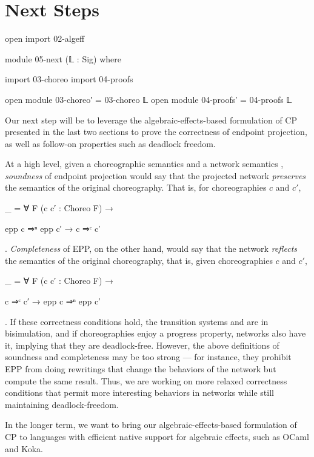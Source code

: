 \section{Next Steps}
\label{sec:next}

\begin{code}[hide]
open import 02-algeff

module 05-next (𝕃 : Sig) where

import 03-choreo
import 04-proofs

open module 03-choreo′ = 03-choreo 𝕃
open module 04-proofs′ = 04-proofs 𝕃

\end{code}

Our next step will be to leverage the algebraic-effects-based formulation of CP presented in the last two sections to prove the correctness of endpoint projection, as well as follow-on properties such as deadlock freedom.

At a high level, given a choreographic semantics  and a network semantics , \emph{soundness} of endpoint projection would say that the projected network \emph{preserves} the semantics of the original choreography.
%
That is, for choreographies $c$ and $c'$,
%
\begin{code}[hide]
_ = ∀ {F} (c c′ : Choreo F) →
\end{code}
%
\begin{code}[inline]
  epp c ⇒ⁿ epp c′ → c ⇒ᶜ c′
\end{code}.
%
\emph{Completeness} of EPP, on the other hand, would say that the network \emph{reflects} the semantics of the original choreography, that is, given choreographies $c$ and $c'$,
%
\begin{code}[hide]
_ = ∀ {F} (c c′ : Choreo F) →
\end{code}
%
\begin{code}[inline]
  c ⇒ᶜ c′ → epp c ⇒ⁿ epp c′
\end{code}.
%
If these correctness conditions hold, the transition systems  and  are in bisimulation,
%
and if choreographies enjoy a progress property, networks also have it, implying that they are deadlock-free.
%
However, the above definitions of soundness and completeness may be too strong --- for instance, they prohibit EPP from doing rewritings that change the behaviors of the network but compute the same result.
%
Thus, we are working on more relaxed correctness conditions that permit more interesting behaviors in networks while still maintaining deadlock-freedom.

In the longer term, we want to bring our algebraic-effects-based formulation of CP to languages with efficient native support for algebraic effects, such as OCaml and Koka.
